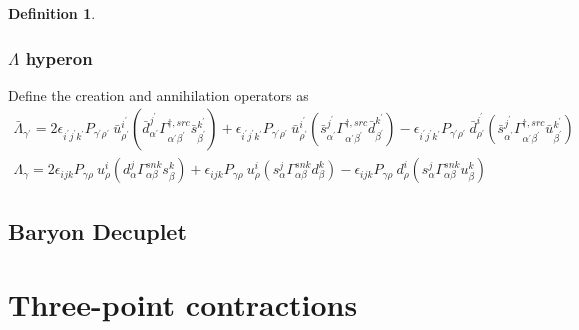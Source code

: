\documentclass[prd,12pt,superscriptaddress,tightenlines,nofootinbib]{revtex4}
\def\a{{\alpha}}
\def\b{{\beta}}
\def\g{{\gamma}}
\def\G{{\Gamma}}
\def\ip{{i^\prime}}
\def\jp{{j^\prime}}
\def\kp{{k^\prime}}
\def\ap{{\alpha^\prime}}
\def\bp{{\beta^\prime}}
\def\gp{{\gamma^\prime}}
\def\rp{{\rho^\prime}}
\theoremstyle{plain}
\theoremstyle{definition}
\newtheorem{defn}[thm]{Definition}
\theoremstyle{remark}
\begin{document}
\begin{defn}
\subsubsection*{$\Lambda$ hyperon}
Define the creation and annihilation operators as
\begin{gather}
	\bar{\Lambda}_{\gp} =  2\epsilon_{\ip\jp\kp} P_{\gp\rp}\ \bar{u}^\ip_\rp (\bar{d}^{\jp}_{\ap} \G^{\dagger,src}_{\ap\bp} \bar{s}^\kp_\bp ) 
	+ \epsilon_{\ip\jp\kp} P_{\gp\rp}\ \bar{u}^\ip_\rp (\bar{s}^{\jp}_{\ap} \G^{\dagger,src}_{\ap\bp} \bar{d}^\kp_\bp ) -
	\epsilon_{\ip\jp\kp} P_{\gp\rp}\ \bar{d}^\ip_\rp (\bar{s}^{\jp}_{\ap} \G^{\dagger,src}_{\ap\bp} \bar{u}^\kp_\bp ) 
	\\
	\Lambda_{\g} = 2\epsilon_{ijk} P_{\g\rho}\ u^i_\rho (d^j_\a \G^{snk}_{\a\b} s^k_\b ) +  \epsilon_{ijk} P_{\g\rho}\ u^i_\rho (s^j_\a \G^{snk}_{\a\b} d^k_\b ) - 
	\epsilon_{ijk} P_{\g\rho}\ d^i_\rho (s^j_\a \G^{snk}_{\a\b} u^k_\b ) 
\end{gather}


	







\subsection*{Baryon Decuplet}


\section{Three-point contractions}


\end{defn}
\end{document}

